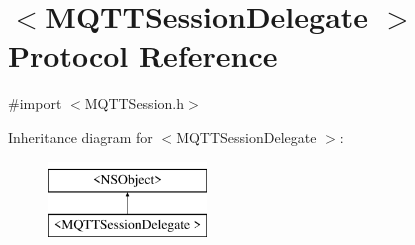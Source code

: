 \hypertarget{protocol_m_q_t_t_session_delegate_01-p}{}\section{$<$M\+Q\+T\+T\+Session\+Delegate $>$ Protocol Reference}
\label{protocol_m_q_t_t_session_delegate_01-p}


{\ttfamily \#import $<$M\+Q\+T\+T\+Session.\+h$>$}

Inheritance diagram for $<$M\+Q\+T\+T\+Session\+Delegate $>$\+:\begin{figure}[H]
\begin{center}
\leavevmode
\includegraphics[height=2.000000cm]{protocol_m_q_t_t_session_delegate_01-p}
\end{center}
\end{figure}
